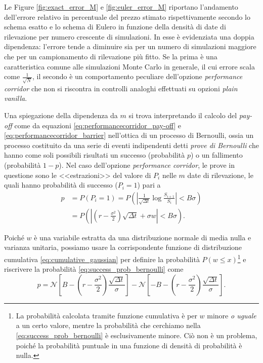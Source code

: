 Le Figure \ref{fig:exact_error_M} e \ref{fig:euler_error_M} riportano l'andamento dell'errore relativo in percentuale del prezzo stimato rispettivamente secondo lo schema esatto e lo schema di Eulero in funzione della densità di date di rilevazione per numero crescente di simulazioni. In esse è evidenziata una doppia dipendenza: l'errore tende a diminuire sia per un numero di simulazioni maggiore che per un campionamento di rilevazione più fitto. Se la prima è una caratteristica comune alle simulazioni Monte Carlo in generale, il cui errore scala come $\frac{1}{\sqrt{N}}$, il secondo è un comportamento peculiare dell'opzione \textit{performance corridor} che non si riscontra in controlli analoghi effettuati su opzioni \textit{plain vanilla}.

Una spiegazione della dipendenza da $m$ si trova interpretando il calcolo del \textit{pay-off} come da equazioni \eqref{eq:performancecorridor_pay-off} e \eqref{eq:performancecorridor_barrier} nell'ottica di un processo di Bernoulli, ossia un processo costituito da una serie di eventi indipendenti detti \textit{prove di Bernoulli} che hanno come soli possibili risultati un successo (probabilità $p$) o un fallimento (probabilità $1-p$). Nel caso dell'opzione \textit{performance corridor}, le prove in questione sono le <<estrazioni>> del valore di $P_i$ nelle $m$ date di rilevazione, le quali hanno probabilità di successo ($P_i=1$) pari a
\begin{equation}
\begin{aligned}
    p &= P(P_i = 1) = P\left(\left| \frac{1}{\sqrt{\Delta t}} \log{\frac{S_{i+1}}{S_i}} \right| < B \sigma\right) \\
    &= P\left(\left| \left(r - \frac{\sigma^2}{2}\right)\sqrt{\Delta t} + \sigma w \right| < B \sigma\right).
    \label{eq:success_prob_bernoulli}
\end{aligned}
\end{equation}

Poiché $w$ è una variabile estratta da una distribuzione normale di media nulla e varianza unitaria, possiamo usare la corrispondente funzione di distribuzione cumulativa \eqref{eq:cumulative_gaussian} per definire la probabilità $P(w \leq x)$\footnote{La probabilità calcolata tramite funzione cumulativa è per $w$ minore \textit{o uguale} a un certo valore, mentre la probabilità che cerchiamo nella \eqref{eq:success_prob_bernoulli} è esclusivamente minore. Ciò non è un problema, poiché la probabilità puntuale in una funzione di densità di probabilità è nulla.} e riscrivere la probabilità \eqref{eq:success_prob_bernoulli} come
\begin{equation}
    p = \mathcal{N}\left[B - \left(r - \frac{\sigma^2}{2}\right)\frac{\sqrt{\Delta t}}{\sigma} \right] - \mathcal{N}\left[- B - \left(r - \frac{\sigma^2}{2}\right)\frac{\sqrt{\Delta t}}{\sigma} \right].
    \label{eq:success_prob_cumul}
\end{equation}

